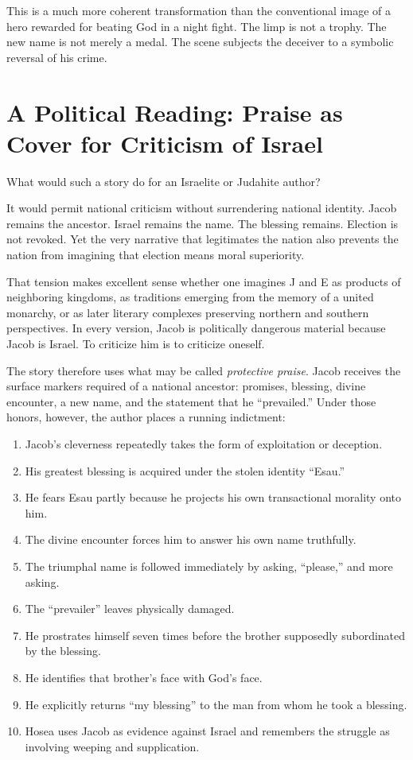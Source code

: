 This is a much more coherent transformation than the conventional image of a hero rewarded for beating God in a night fight. The limp is not a trophy. The new name is not merely a medal. The scene subjects the deceiver to a symbolic reversal of his crime.

\section{A Political Reading: Praise as Cover for Criticism of Israel}

What would such a story do for an Israelite or Judahite author?

It would permit national criticism without surrendering national identity. Jacob remains the ancestor. Israel remains the name. The blessing remains. Election is not revoked. Yet the very narrative that legitimates the nation also prevents the nation from imagining that election means moral superiority.

That tension makes excellent sense whether one imagines J and E as products of neighboring kingdoms, as traditions emerging from the memory of a united monarchy, or as later literary complexes preserving northern and southern perspectives. In every version, Jacob is politically dangerous material because Jacob is Israel. To criticize him is to criticize oneself.

The story therefore uses what may be called \emph{protective praise}. Jacob receives the surface markers required of a national ancestor: promises, blessing, divine encounter, a new name, and the statement that he ``prevailed.'' Under those honors, however, the author places a running indictment:

\begin{enumerate}[leftmargin=2em,itemsep=0.2em]
\item Jacob's cleverness repeatedly takes the form of exploitation or deception.
\item His greatest blessing is acquired under the stolen identity ``Esau.''
\item He fears Esau partly because he projects his own transactional morality onto him.
\item The divine encounter forces him to answer his own name truthfully.
\item The triumphal name is followed immediately by asking, ``please,'' and more asking.
\item The ``prevailer'' leaves physically damaged.
\item He prostrates himself seven times before the brother supposedly subordinated by the blessing.
\item He identifies that brother's face with God's face.
\item He explicitly returns ``my blessing'' to the man from whom he took a blessing.
\item Hosea uses Jacob as evidence against Israel and remembers the struggle as involving weeping and supplication.
\end{enumerate}

